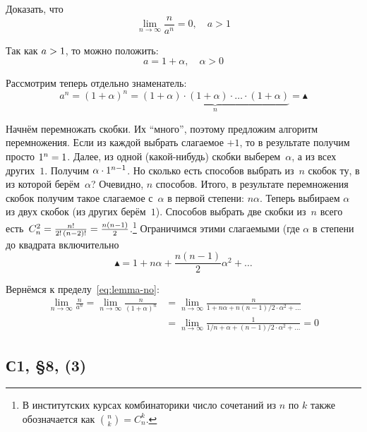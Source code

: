 \documentclass[a4paper,12pt]{article}
\begin{document}
  Доказать, что
  \begin{equation}\label{eq:lemma-no}
    \lim_{n \to \infty} \frac{n}{a^n} = 0,\quad a > 1
  \end{equation}
  
  \begin{solution}
    Так как $a \hm> 1$, то можно положить:
    \[
      a = 1 + \alpha,\quad \alpha > 0
    \]
    
    Рассмотрим теперь отдельно знаменатель:
    \[
      a^n = (1 + \alpha)^n = \underbrace{(1 + \alpha) \cdot (1 + \alpha) \cdot \ldots \cdot (1 + \alpha)}_{n} = \blacktriangle
    \]
    
    Начнём перемножать скобки.
    Их ``много'', поэтому предложим алгоритм перемножения.
    Если из каждой выбрать слагаемое ${+}1$, то в результате получим просто $1^n \hm= 1$.
    Далее, из одной (какой-нибудь) скобки выберем~$\alpha$, а из всех других~$1$.
    Получим $\alpha \hm\cdot 1^{n - 1}$.
    Но сколько есть способов выбрать из~$n$ скобок ту, в из которой берём~$\alpha$?
    Очевидно, $n$ способов.
    Итого, в результате перемножения скобок получим такое слагаемое с~$\alpha$ в первой степени: $n \alpha$.
    Теперь выбираем $\alpha$ из двух скобок (из других берём~$1$).
    Способов выбрать две скобки из~$n$ всего есть~$C_n^2 \hm= \frac{n!}{2!\,(n - 2)!} \hm= \frac{n(n - 1)}{2}$.\footnote{
      В институтских курсах комбинаторики число сочетаний из $n$ по $k$ также обозначается как $\binom{n}{k} = C_n^k$.
    }
    Ограничимся этими слагаемыми (где $\alpha$ в степени до квадрата включительно
    \[
      \blacktriangle = 1 + n \alpha + \frac{n(n - 1)}{2} \alpha^2 + \ldots
    \]
    
    Вернёмся к пределу~\eqref{eq:lemma-no}:
    \begin{equation*}
    \begin{split}
      \lim_{n \to \infty} \frac{n}{a^n}
        = \lim_{n \to \infty} \frac{n}{(1 + \alpha)^n}
        &= \lim_{n \to \infty} \frac{n}{1 + n \alpha + n(n - 1)/2 \cdot \alpha^2 + \ldots}\\
        &= \lim_{n \to \infty} \frac{1}{1/n + \alpha + (n - 1)/2 \cdot \alpha^2 + \ldots}
        = 0
    \end{split}
    \end{equation*}
  \end{solution}
  
  
  \subsection{С1, \S 8, (3)}
  
\end{document}
